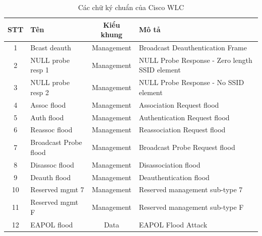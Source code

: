 \begin{table}[h!]
\centering
\small
\setlength{\extrarowheight}{1pt}
\caption{\label{tab:cisco-wlc-signature}Các chữ ký chuẩn của Cisco WLC}
\begin{tabular}{|c|p{3.9cm}|c|p{6.8cm}|}
\hline
\multicolumn{1}{|l|}{\textbf{STT}} & \textbf{Tên}          & \textbf{Kiểu khung} & \textbf{Mô tả}                                 \\ \hline
1                                  & Bcast deauth          & Management          & Broadcast Deauthentication Frame               \\ \hline
2                                  & NULL probe resp 1     & Management          & NULL Probe Response - Zero length SSID element \\ \hline
3                                  & NULL probe resp 2     & Management          & NULL Probe Response - No SSID element          \\ \hline
4                                  & Assoc flood           & Management          & Association Request flood                      \\ \hline
5                                  & Auth flood            & Management          & Authentication Request flood                   \\ \hline
6                                  & Reassoc flood         & Management          & Reassociation Request flood                    \\ \hline
7                                  & Broadcast Probe flood & Management          & Broadcast Probe Request flood                  \\ \hline
8                                  & Disassoc flood        & Management          & Disassociation flood                           \\ \hline
9                                  & Deauth flood          & Management          & Deauthentication flood                         \\ \hline
10                                 & Reserved mgmt 7       & Management          & Reserved management sub-type 7                 \\ \hline
11                                 & Reserved mgmt F       & Management          & Reserved management sub-type F                 \\ \hline
12                                 & EAPOL flood           & Data                & EAPOL Flood Attack                             \\ \hline

\end{tabular}
\end{table}

